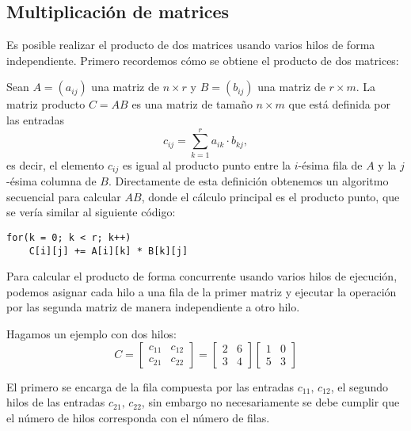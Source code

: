 \documentclass[a4paper,11pt]{article}
\begin{document}
	\subsection{Multiplicación de matrices}
	Es posible realizar el producto de dos matrices usando varios hilos de forma independiente. Primero recordemos cómo se obtiene el producto de dos matrices:

	Sean $ A = (a_{ij}) $ una matriz de $ n\times r $ y $ B = (b_{ij}) $ una matriz de $ r \times m $. La matriz producto $ C = A B $ es una matriz de tamaño $ n \times m $ que está definida por las entradas
	\[ c_{ij} = \sum_{k=1}^{r} a_{ik} \cdot b_{kj}, \]
	es decir, el elemento $ c_{ij} $ es igual al producto punto entre la $ i $-ésima fila de $ A $ y la $ j $-ésima columna de $ B $.
	Directamente de esta definición obtenemos un algoritmo secuencial para calcular $ AB $, donde el cálculo principal es el producto punto, que se vería similar al siguiente código: \\
	\begin{tcolorbox}
		\begin{lstlisting}
for(k = 0; k < r; k++)
    C[i][j] += A[i][k] * B[k][j]
		\end{lstlisting}
	\end{tcolorbox}


	Para calcular el producto de forma concurrente usando varios hilos de ejecución, podemos asignar cada hilo a una fila de la primer matriz y ejecutar la operación por las segunda matriz de manera independiente a otro hilo.

	Hagamos un ejemplo con dos hilos:
	\[C=
	\begin{bmatrix}
		c_{11} & c_{12} \\
		c_{21} & c_{22}
	\end{bmatrix}
	=
	\begin{bmatrix}
		2 & 6 \\
		3 & 4
	\end{bmatrix}
	\begin{bmatrix}
		1 & 0 \\
		5 & 3
	\end{bmatrix}
	\]

	El primero se encarga de la fila compuesta por las entradas  $ c_{11},\, c_{12} $, el segundo hilos de las entradas $ c_{21},\, c_{22} $, sin embargo no necesariamente se debe cumplir que el número de hilos corresponda con el número de filas.
\end{document}
